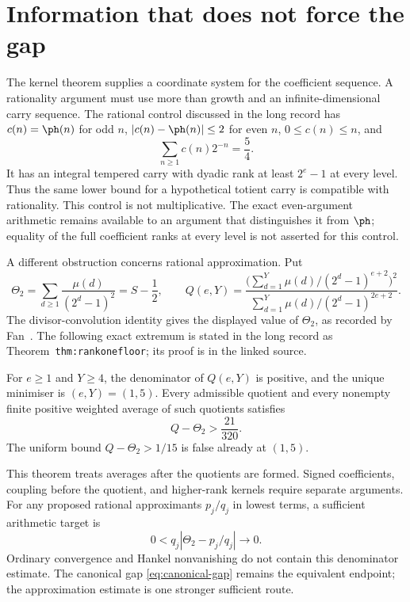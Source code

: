 \section{Information that does not force the gap}\label{sec:nogo}
The kernel theorem supplies a coordinate system for the coefficient sequence.
A rationality argument must use more than growth and an infinite-dimensional
carry sequence. The rational control discussed in the long record has
$c(n)=\ph(n)$ for odd $n$, $|c(n)-\ph(n)|\le2$ for even $n$, $0\le c(n)\le n$,
and
\[
 \sum_{n\ge1}c(n)2^{-n}=\frac54.
\]
It has an integral tempered carry with dyadic rank at least $2^e-1$ at every
level. Thus the same lower bound for a hypothetical totient carry is
compatible with rationality. This control is not multiplicative. The exact
even-argument arithmetic remains available to an argument that distinguishes
it from $\ph$; equality of the full coefficient ranks at every level is not
asserted for this control.

A different obstruction concerns rational approximation. Put
\[
 \Theta_2=\sum_{d\ge1}\frac{\mu(d)}{(2^d-1)^2}=S-\frac12,
 \qquad
 Q(e,Y)=\frac{\bigl(\sum_{d=1}^{Y}\mu(d)/(2^d-1)^{e+2}\bigr)^2}
 {\sum_{d=1}^{Y}\mu(d)/(2^d-1)^{2e+2}}.
\]
The divisor-convolution identity gives the displayed value of $\Theta_2$,
as recorded by Fan~\cite{fan2026totient}. The following exact extremum is
stated in the long record as Theorem~\texttt{thm:rankonefloor}; its proof is
in the linked source.

\begin{theorem}\label{res:rankonefloor}
For $e\ge1$ and $Y\ge4$, the denominator of $Q(e,Y)$ is positive, and the
unique minimiser is $(e,Y)=(1,5)$. Every admissible quotient and every
nonempty finite positive weighted average of such quotients satisfies
\[
 Q-\Theta_2>\frac{21}{320}.
\]
The uniform bound $Q-\Theta_2>1/15$ is false already at $(1,5)$.
\end{theorem}
This theorem treats averages after the quotients are formed. Signed
coefficients, coupling before the quotient, and higher-rank kernels require
separate arguments. For any proposed rational approximants $p_j/q_j$ in
lowest terms, a sufficient arithmetic target is
\[
 0<q_j\left|\Theta_2-p_j/q_j\right|\longrightarrow0.
\]
Ordinary convergence and Hankel nonvanishing do not contain this denominator
estimate. The canonical gap \eqref{eq:canonical-gap} remains the equivalent
endpoint; the approximation estimate is one stronger sufficient route.

